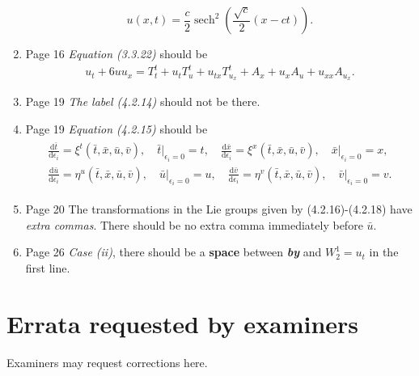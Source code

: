 \documentclass[11pt]{article}
\DeclareMathOperator{\sech}{sech}
\begin{document}
\begin{enumerate}
{\begin{equation}
u(x,t) = \frac{c}{2} \sech^2\left( \frac{ \sqrt{c}}{2}(x-ct)\right).
\end{equation} }
 \item Page 16 \textit{Equation (3.3.22)} should be \begin{align}
u_{t}+6 u u_{x}= T^t_t+u_{t} T^t_u +u_{tx}T^t_{u_x}+A_x+u_xA_u  +u_{xx}A_{u_x}. \label{mbilia}
\end{align}
\item Page 19 \textit{ The label (4.2.14)} should not be there.
\item Page 19 \textit{Equation (4.2.15)} should be \begin{align} \begin{aligned}
\frac{ \mathrm{d} \bar{t}}{ \mathrm{d} \epsilon_i} = \xi^t( \bar{t},\bar{x},\bar{u},\bar{v}),\quad \bar{t}\Big |_{ \epsilon_i =0} =t, \quad
\frac{ \mathrm{d} \bar{x}}{  \mathrm{d} \epsilon_i} = \xi^x( \bar{t},\bar{x},\bar{u},\bar{v}),\quad \bar{x}\Big |_{ \epsilon_i =0} =x, \\
\frac{ \mathrm{d} \bar{u}}{  \mathrm{d} \epsilon_i} = \eta^u( \bar{t},\bar{x},\bar{u},\bar{v}),\quad \bar{u}\Big |_{ \epsilon_i =0} =u, \quad \frac{ \mathrm{d} \bar{v}}{  \mathrm{d} \epsilon_i} =\eta^v( \bar{t},\bar{x},\bar{u},\bar{v}),\quad \bar{v}\Big |_{ \epsilon_i =0} =v. \label{liq} \end{aligned}
\end{align}
\item Page 20 The transformations in the Lie groups given by (4.2.16)-(4.2.18) have \textit{extra commas}. There should be no extra comma immediately before $\bar{u}$.
\item Page 26 \textit{Case (ii)}, there should be a \textbf{space} between \textit{\textbf{by}} and \textit{$ W_2^1=u_t$} in the first line.
\end{enumerate}

\section{Errata requested by examiners}
Examiners may request corrections here.
\end{document}
